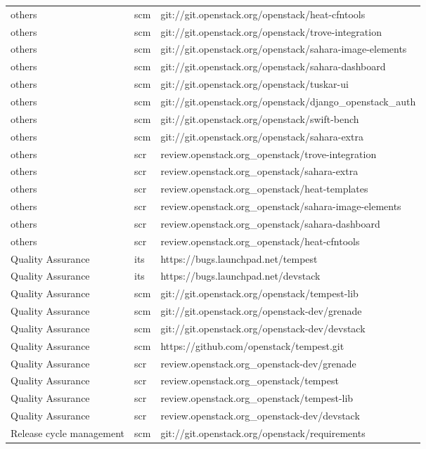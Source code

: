 \begin{center}
\begin{longtable}{|p{4cm}|p{1cm}|p{10cm}|}
others&scm&git://git.openstack.org/openstack/heat-cfntools\\
others&scm&git://git.openstack.org/openstack/trove-integration\\
others&scm&git://git.openstack.org/openstack/sahara-image-elements\\
others&scm&git://git.openstack.org/openstack/sahara-dashboard\\
others&scm&git://git.openstack.org/openstack/tuskar-ui\\
others&scm&git://git.openstack.org/openstack/django\_openstack\_auth\\
others&scm&git://git.openstack.org/openstack/swift-bench\\
others&scm&git://git.openstack.org/openstack/sahara-extra\\
others&scr&review.openstack.org\_openstack/trove-integration\\
others&scr&review.openstack.org\_openstack/sahara-extra\\
others&scr&review.openstack.org\_openstack/heat-templates\\
others&scr&review.openstack.org\_openstack/sahara-image-elements\\
others&scr&review.openstack.org\_openstack/sahara-dashboard\\
others&scr&review.openstack.org\_openstack/heat-cfntools\\
Quality Assurance&its&https://bugs.launchpad.net/tempest\\
Quality Assurance&its&https://bugs.launchpad.net/devstack\\
Quality Assurance&scm&git://git.openstack.org/openstack/tempest-lib\\
Quality Assurance&scm&git://git.openstack.org/openstack-dev/grenade\\
Quality Assurance&scm&git://git.openstack.org/openstack-dev/devstack\\
Quality Assurance&scm&https://github.com/openstack/tempest.git\\
Quality Assurance&scr&review.openstack.org\_openstack-dev/grenade\\
Quality Assurance&scr&review.openstack.org\_openstack/tempest\\
Quality Assurance&scr&review.openstack.org\_openstack/tempest-lib\\
Quality Assurance&scr&review.openstack.org\_openstack-dev/devstack\\
Release cycle management&scm&git://git.openstack.org/openstack/requirements\\

\end{longtable}
\end{center}

